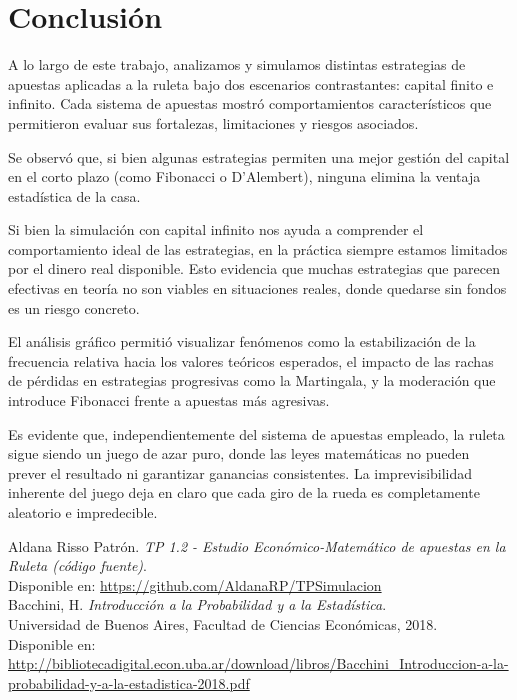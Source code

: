 \documentclass{article}
\begin{document}
\section{Conclusión}
A lo largo de este trabajo, analizamos y simulamos distintas estrategias de apuestas aplicadas a la ruleta bajo dos escenarios contrastantes: capital finito e infinito. Cada sistema de apuestas mostró comportamientos característicos que permitieron evaluar sus fortalezas, limitaciones y riesgos asociados.

Se observó que, si bien algunas estrategias permiten una mejor gestión del capital en el corto plazo (como Fibonacci o D'Alembert), ninguna elimina la ventaja estadística de la casa.

Si bien la simulación con capital infinito nos ayuda a comprender el comportamiento ideal de las estrategias, en la práctica siempre estamos limitados por el dinero real disponible. Esto evidencia que muchas estrategias que parecen efectivas en teoría no son viables en situaciones reales, donde quedarse sin fondos es un riesgo concreto.

El análisis gráfico permitió visualizar fenómenos como la estabilización de la frecuencia relativa hacia los valores teóricos esperados, el impacto de las rachas de pérdidas en estrategias progresivas como la Martingala, y la moderación que introduce Fibonacci frente a apuestas más agresivas.

Es evidente que, independientemente del sistema de apuestas empleado, la ruleta sigue siendo un juego de azar puro, donde las leyes matemáticas no pueden prever el resultado ni garantizar ganancias consistentes. La imprevisibilidad inherente del juego deja en claro que cada giro de la rueda es completamente aleatorio e impredecible.

  
\begin{thebibliography}

Aldana Risso Patrón. \textit{TP 1.2 - Estudio Económico-Matemático de apuestas en la Ruleta (código fuente)}.\\
Disponible en: \url{https://github.com/AldanaRP/TPSimulacion} \\

Bacchini, H. \textit{Introducción a la Probabilidad y a la Estadística}.\\
Universidad de Buenos Aires, Facultad de Ciencias Económicas, 2018.\\
Disponible en: \url{http://bibliotecadigital.econ.uba.ar/download/libros/Bacchini_Introduccion-a-la-probabilidad-y-a-la-estadistica-2018.pdf}

\end{thebibliography}

    
\end{document}
